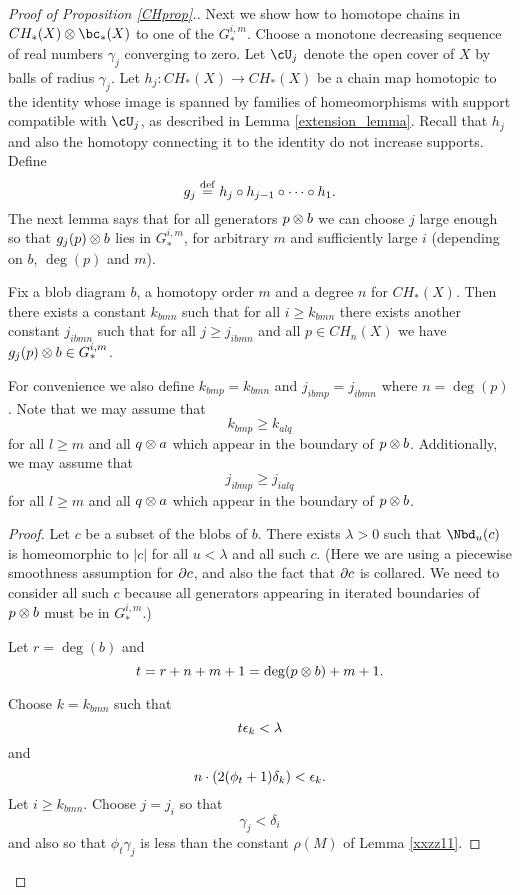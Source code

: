 \begin{proof}[Proof of Proposition \ref{CHprop}.]
Next we show how to homotope chains in $CH_*(X)\ot \bc_*(X)$ to one of the 
$G_*^{i,m}$.
Choose a monotone decreasing sequence of real numbers $\gamma_j$ converging to zero.
Let $\cU_j$ denote the open cover of $X$ by balls of radius $\gamma_j$.
Let $h_j: CH_*(X)\to CH_*(X)$ be a chain map homotopic to the identity whose image is 
spanned by families of homeomorphisms with support compatible with $\cU_j$, 
as described in Lemma \ref{extension_lemma}.
Recall that $h_j$ and also the homotopy connecting it to the identity do not increase
supports.
Define
\[
	g_j \stackrel{\mathrm{def}}{=} h_j\circ h_{j-1} \circ \cdots \circ h_1 .
\]
The next lemma says that for all generators $p\otimes b$ we can choose $j$ large enough so that
$g_j(p)\otimes b$ lies in $G_*^{i,m}$, for arbitrary $m$ and sufficiently large $i$ 
(depending on $b$, $\deg(p)$ and $m$).

\begin{lemma} \label{Gim_approx}
Fix a blob diagram $b$, a homotopy order $m$ and a degree $n$ for $CH_*(X)$.
Then there exists a constant $k_{bmn}$ such that for all $i \ge k_{bmn}$
there exists another constant $j_{ibmn}$ such that for all $j \ge j_{ibmn}$ and all $p\in CH_n(X)$ 
we have $g_j(p)\otimes b \in G_*^{i,m}$.
\end{lemma}

For convenience we also define $k_{bmp} = k_{bmn}$
and $j_{ibmp} = j_{ibmn}$ where $n=\deg(p)$.
Note that we may assume that
\[
	k_{bmp} \ge k_{alq}
\]
for all $l\ge m$ and all $q\otimes a$ which appear in the boundary of $p\otimes b$.
Additionally, we may assume that
\[
	j_{ibmp} \ge j_{ialq}
\]
for all $l\ge m$ and all $q\otimes a$ which appear in the boundary of $p\otimes b$.


\begin{proof}
Let $c$ be a subset of the blobs of $b$.
There exists $\lambda > 0$ such that $\Nbd_u(c)$ is homeomorphic to $|c|$ for all $u < \lambda$ 
and all such $c$.
(Here we are using a piecewise smoothness assumption for $\partial c$, and also
the fact that $\partial c$ is collared.
We need to consider all such $c$ because all generators appearing in
iterated boundaries of $p\otimes b$ must be in $G_*^{i,m}$.)

Let $r = \deg(b)$ and 
\[
	t = r+n+m+1 = \deg(p\otimes b) + m + 1.
\]

Choose $k = k_{bmn}$ such that
\[
	t\epsilon_k < \lambda
\]
and
\[
	n\cdot (2 (\phi_t + 1) \delta_k) < \epsilon_k .
\]
Let $i \ge k_{bmn}$.
Choose $j = j_i$ so that
\[
	\gamma_j < \delta_i
\]
and also so that $\phi_t \gamma_j$ is less than the constant $\rho(M)$ of Lemma \ref{xxzz11}.


\end{proof}
\end{proof}
